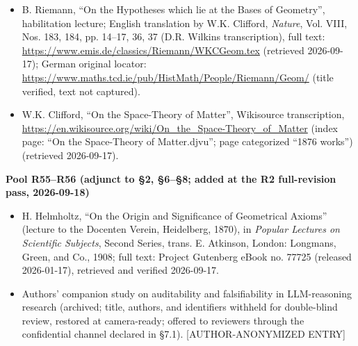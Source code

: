 \documentclass[11pt,a4paper]{article}
\begin{document}
\begin{itemize}[leftmargin=1.6em,itemsep=2pt,parsep=0pt,topsep=3pt]
\item[R53.] B. Riemann, ``On the Hypotheses which lie at the Bases of Geometry'', habilitation lecture; English translation by W.K. Clifford, \textit{Nature}, Vol. VIII, Nos. 183, 184, pp. 14–17, 36, 37 (D.R. Wilkins transcription), full text: \url{https://www.emis.de/classics/Riemann/WKCGeom.tex} (retrieved 2026-09-17); German original locator: \url{https://www.maths.tcd.ie/pub/HistMath/People/Riemann/Geom/} (title verified, text not captured).
\item[R54.] W.K. Clifford, ``On the Space-Theory of Matter'', Wikisource transcription, \url{https://en.wikisource.org/wiki/On_the_Space-Theory_of_Matter} (index page: ``On the Space-Theory of Matter.djvu''; page categorized ``1876 works'') (retrieved 2026-09-17).
\end{itemize}

\medskip
\noindent\textbf{Pool R55–R56 (adjunct to §2, §6–§8; added at the R2 full-revision pass, 2026-09-18)}\par\addvspace{2pt}

\begin{itemize}[leftmargin=1.6em,itemsep=2pt,parsep=0pt,topsep=3pt]
\item[R55.] H. Helmholtz, ``On the Origin and Significance of Geometrical Axioms'' (lecture to the Docenten Verein, Heidelberg, 1870), in \textit{Popular Lectures on Scientific Subjects}, Second Series, trans. E. Atkinson, London: Longmans, Green, and Co., 1908; full text: Project Gutenberg eBook no. 77725 (released 2026-01-17), retrieved and verified 2026-09-17.
\item[R56.] Authors' companion study on auditability and falsifiability in LLM-reasoning research (archived; title, authors, and identifiers withheld for double-blind review, restored at camera-ready; offered to reviewers through the confidential channel declared in §7.1). [AUTHOR-ANONYMIZED ENTRY]
\end{itemize}
\end{document}
